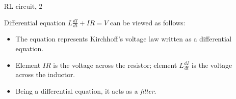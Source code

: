 \documentclass{beamer}
\begin{document}
\begin{frame}{RL circuit, 2}
	\begin{flushleft}
		
		Differential equation $L \frac{dI}{dt} + IR = V$ can be viewed as follows:
		
		\bigskip
		
		\begin{itemize}
			\item The equation represents Kirchhoff's voltage law written as a differential equation.
			\item Element $IR$ is the voltage across the resistor; element $L \frac{dI}{dt}$ is the voltage across the inductor.
			\item Being a differential equation, it acts as a \emph{filter}.
		\end{itemize}
		
	\end{flushleft}
\end{frame}
\end{document}
